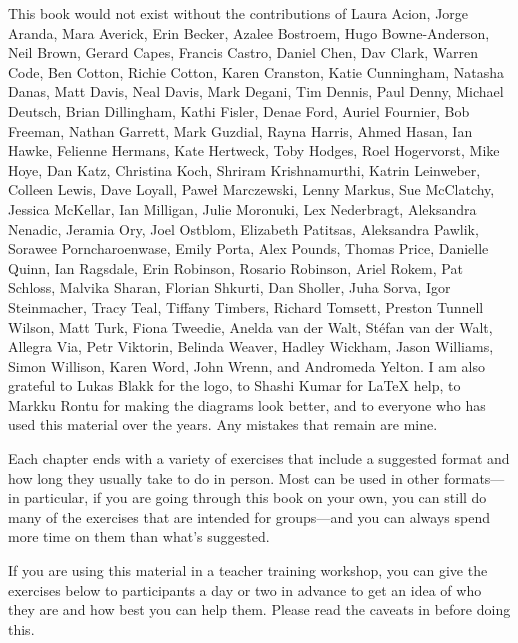 
This book would not exist without the contributions of
Laura Acion,
Jorge Aranda,
Mara Averick,
Erin Becker,
Azalee Bostroem,
Hugo Bowne-Anderson,
Neil Brown,
Gerard Capes,
Francis Castro,
Daniel Chen,
Dav Clark,
Warren Code,
Ben Cotton,
Richie Cotton,
Karen Cranston,
Katie Cunningham,
Natasha Danas,
Matt Davis,
Neal Davis,
Mark Degani,
Tim Dennis,
Paul Denny,
Michael Deutsch,
Brian Dillingham,
Kathi Fisler,
Denae Ford,
Auriel Fournier,
Bob Freeman,
Nathan Garrett,
Mark Guzdial,
Rayna Harris,
Ahmed Hasan,
Ian Hawke,
Felienne Hermans,
Kate Hertweck,
Toby Hodges,
Roel Hogervorst,
Mike Hoye,
Dan Katz,
Christina Koch,
Shriram Krishnamurthi,
Katrin Leinweber,
Colleen Lewis,
Dave Loyall,
Paweł Marczewski,
Lenny Markus,
Sue McClatchy,
Jessica McKellar,
Ian Milligan,
Julie Moronuki,
Lex Nederbragt,
Aleksandra Nenadic,
Jeramia Ory,
Joel Ostblom,
Elizabeth Patitsas,
Aleksandra Pawlik,
Sorawee Porncharoenwase,
Emily Porta,
Alex Pounds,
Thomas Price,
Danielle Quinn,
Ian Ragsdale,
Erin Robinson,
Rosario Robinson,
Ariel Rokem,
Pat Schloss,
Malvika Sharan,
Florian Shkurti,
Dan Sholler,
Juha Sorva,
Igor Steinmacher,
Tracy Teal,
Tiffany Timbers,
Richard Tomsett,
Preston Tunnell Wilson,
Matt Turk,
Fiona Tweedie,
Anelda van der Walt,
Stéfan van der Walt,
Allegra Via,
Petr Viktorin,
Belinda Weaver,
Hadley Wickham,
Jason Williams,
Simon Willison,
Karen Word,
John Wrenn,
and Andromeda Yelton.
I am also grateful to Lukas Blakk for the logo,
to Shashi Kumar for LaTeX help,
to Markku Rontu for making the diagrams look better,
and to everyone who has used this material over the years.
Any mistakes that remain are mine.


Each chapter ends with a variety of exercises that include a suggested format
and how long they usually take to do in person.
Most can be used in other formats---in particular,
if you are going through this book on your own,
you can still do many of the exercises that are intended for groups---and
you can always spend more time on them than what's suggested.

If you are using this material in a teacher training workshop,
you can give the exercises below to participants a day or two in advance
to get an idea of who they are and how best you can help them.
Please read the caveats in  before doing this.


